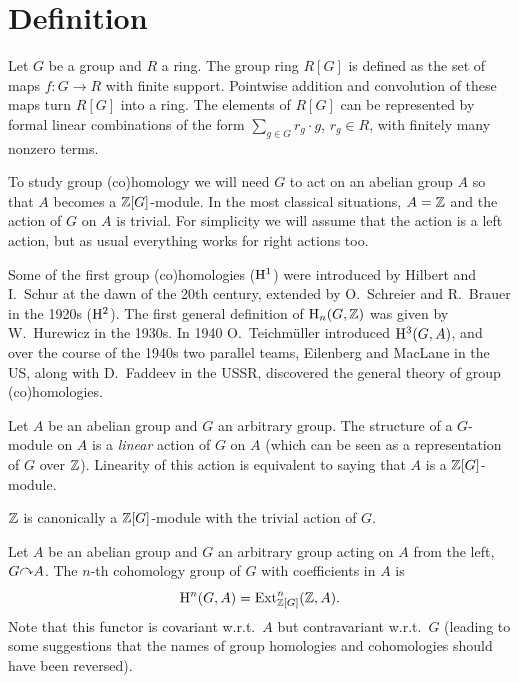 \section{Definition}


\begin{defn}
    Let $G$ be a group and $R$ a ring. The group ring $R[G]$ is defined as the set of maps $f:G\to R$ with finite support. Pointwise addition and convolution of these maps turn $R[G]$ into a ring. The elements of $R[G]$ can be represented by formal linear combinations of the form $\sum_{g\in G} r_g\cdot g$, $r_g\in R$, with finitely many nonzero terms.
\end{defn}

To study group (co)homology we will need $G$ to act on an abelian group $A$ so that $A$ becomes a $\mathbb{Z}[G]$-module. In the most classical situations, $A=\mathbb{Z}$ and the action of $G$ on $A$ is trivial. For simplicity we will assume that the action is a left action, but as usual everything works for right actions too. 

\begin{hrem*}
    Some of the first group (co)homologies ($\mathrm{H}^1$) were introduced by Hilbert and I.~Schur at the dawn of the 20th century, extended by O.~Schreier and R.~Brauer in the 1920s ($\mathrm{H}^2$). The first general definition of $\mathrm{H}_n(G,\mathbb{Z})$ was given by W.~Hurewicz in the 1930s. In 1940 O.~Teichm\"uller introduced $\mathrm{H}^3(G,A)$, and over the course of the 1940s two parallel teams, Eilenberg and MacLane in the US, along with D.~Faddeev in the USSR, discovered the general theory of group (co)homologies.
\end{hrem*}

\begin{defn}[$G$-module]
    Let $A$ be an abelian group and $G$ an arbitrary group. The structure of a $G$-module on $A$ is a \emph{linear} action of $G$ on $A$ (which can be seen as a representation of $G$ over $\mathbb{Z}$). Linearity of this action is equivalent to saying that $A$ is a $\mathbb{Z}[G]$-module.
\end{defn}

\begin{example}
    $\mathbb{Z}$ is canonically a $\mathbb{Z}[G]$-module with the trivial action of $G$.
\end{example} 

\begin{defn}
    Let $A$ be an abelian group and $G$ an arbitrary group acting on $A$ from the left, $G\acts A$. The $n$-th cohomology group of $G$ with coefficients in $A$ is
    \[\mathrm{H}^n(G,A)=\operatorname{Ext}_{\mathbb{Z}[G]}^n(\mathbb{Z},A).\]
    Note that this functor is covariant w.r.t.\ $A$ but contravariant w.r.t.\ $G$ (leading to some suggestions that the names of group homologies and cohomologies should have been reversed). 
\end{defn}

